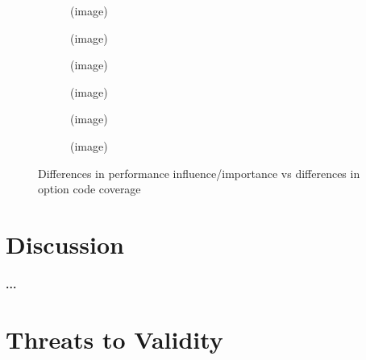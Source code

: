 \begin{figure}
	\centering
	\begin{subfigure}{0.33\textwidth}
		\centering
		(image)
		\caption{\batik}
	\end{subfigure}
	\begin{subfigure}{0.33\textwidth}
		\centering
		(image)
		\caption{\dconvert}
	\end{subfigure}
	\begin{subfigure}{0.33\textwidth}
		\centering
		(image)
		\caption{\htwo}
	\end{subfigure}
	\begin{subfigure}{0.33\textwidth}
		\centering
		(image)
		\caption{\jumper}
	\end{subfigure}
	\begin{subfigure}{0.33\textwidth}
		\centering
		(image)
		\caption{\jadx}
	\end{subfigure}
	\begin{subfigure}{0.33\textwidth}
		\centering
		(image)
		\caption{\kanzi}
	\end{subfigure}
	\caption{Differences in performance influence/importance vs differences in option code coverage}
	\label{fig:diff_performance_option_coverage}
\end{figure}


\section{Discussion}
\paragraph*{...}
\section{Threats to Validity}\label{sec:threats}

